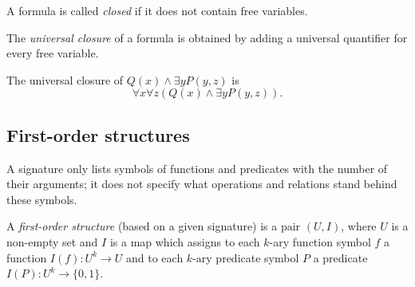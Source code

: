 \begin{page}
\setcounter{section}{1}
\setcounter{subsection}{3}
\setcounter{dfn}{8}
\label{portion:583}

\begin{dfn}
A formula is called \emph{closed} if it does not contain free variables.
\end{dfn}

\end{page}

\begin{page}
\setcounter{section}{1}
\setcounter{subsection}{3}
\setcounter{dfn}{9}
\label{portion:586}

\begin{dfn}
The \emph{universal closure} of a formula is obtained by adding a universal quantifier for every free variable.
\end{dfn}

\end{page}

\begin{page}
\setcounter{section}{1}
\setcounter{subsection}{3}
\setcounter{dfn}{10}
\label{portion:589}

\begin{exl}
The universal closure of $Q(x) \wedge \exists y P(y,z)$ is
\[
\forall x \forall z (Q(x) \wedge \exists y P(y,z)).
\]
\end{exl}

\end{page}

\begin{page}
\setcounter{section}{1}
\setcounter{subsection}{4}
\setcounter{dfn}{10}
\label{portion:592}

\subsection{First-order structures}
A signature only lists symbols of functions and predicates with the number of their arguments;
it does not specify what operations and relations stand behind these symbols.


\end{page}

\begin{page}
\setcounter{section}{1}
\setcounter{subsection}{4}
\setcounter{dfn}{11}
\label{portion:594}

\begin{dfn}
A \emph{first-order structure} (based on a given signature) is a pair $(U, I)$, where
$U$ is a non-empty set and $I$ is a map which assigns to each $k$-ary function symbol $f$
a function $I(f) \colon U^k \to U$ and to each $k$-ary predicate symbol $P$ a predicate $I(P) \colon U^k \to \{0,1\}$.
\end{dfn}

\end{page}

